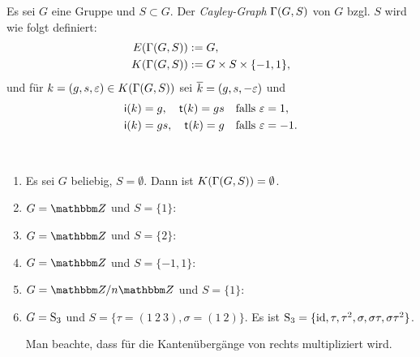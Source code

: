 \DB Es sei $G$ eine Gruppe und $S\subset G$.
Der \emph{Cayley-Graph}
$\Gamma(G,S)$ von $G$ bzgl. $S$ wird wie folgt definiert:
\begin{align*}
E(\Gamma(G,S)) &:= G, \\
K(\Gamma(G,S)) &:= G \times S \times \{-1,1\},
\end{align*}
und für $k=(g,s,\varepsilon)\in K(\Gamma(G,S))$ sei $\overline{k}=(g,s,-\varepsilon)$
und
\begin{align*}
&\mathsf{i}(k) = g, \quad \mathsf{t}(k) = gs \quad \text{falls } \varepsilon = 1, \\
&\mathsf{i}(k) = gs, \quad \mathsf{t}(k) = g \quad \text{falls } \varepsilon = -1.
\end{align*}

\BSP\label{bsp_cay}\
\begin{enumerate}
\item Es sei $G$ beliebig, $S=\emptyset$.
Dann ist $K(\Gamma(G,S))=\emptyset$.
\item $G=\ZZ$ und $S=\{1\}$:
\begin{center}
\end{center}
\item $G=\ZZ$ und $S=\{2\}$:
\begin{center}
\end{center}
\item $G=\ZZ$ und $S=\{-1,1\}$:
\begin{center}
\end{center}
\item $G=\ZZ/n\ZZ$ und $S=\{1\}$:
\begin{center}
\end{center}
\item $G=\mathrm{S}_3$ und $S=\{\tau=(1\ 2\ 3),\sigma=(1\ 2)\}$.
Es ist $\mathrm{S}_3=\{\mathrm{id},\tau,\tau^2,\sigma,\sigma\tau,\sigma\tau^2\}$.
\begin{center}
\end{center}
Man beachte, dass für die Kantenübergänge von rechts multipliziert 
wird.
\end{enumerate}

